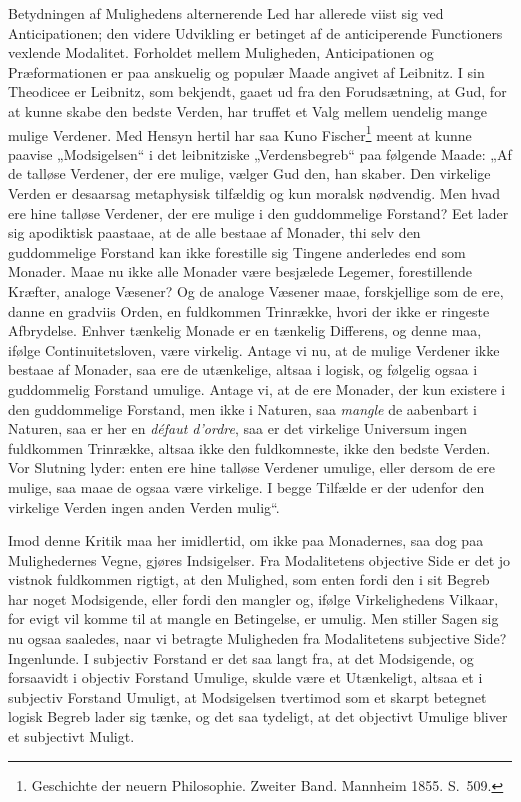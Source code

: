 \documentclass[12pt]{book}
\newcommand{\opage}[1]{\marginnote{\footnotesize\textit{[#1]}}}
\begin{document}
Betydningen af Mulighedens alternerende Led har allerede viist sig ved Anticipationen; den videre Udvikling er betinget af de anticiperende Functioners vexlende Modalitet. Forholdet mellem Muligheden, Anticipationen og Præformationen er paa anskuelig og populær Maade angivet af Leibnitz. I sin Theodicee er Leibnitz, som bekjendt, gaaet ud fra den Forudsætning, at Gud, for at kunne skabe den bedste Verden, har truffet et Valg mellem uendelig mange mulige Verdener. Med Hensyn hertil har saa Kuno Fischer\footnote{Geschichte der neuern Philosophie. Zweiter Band. Mannheim 1855. S.~509.}%
{} meent at kunne paavise „Modsigelsen“ i det leibnitziske „Verdensbegreb“ paa følgende Maade: „Af de talløse Verdener, der ere mulige, vælger Gud den, han skaber. Den virkelige Verden er desaarsag metaphysisk tilfældig og kun moralsk nødvendig. Men hvad ere hine talløse Verdener, der ere mulige i den guddommelige Forstand? Eet lader sig apodiktisk paastaae, at de alle bestaae af Monader, thi selv den guddommelige Forstand kan ikke forestille sig Tingene anderledes end som Monader. Maae nu ikke alle Monader være besjælede Legemer, forestillende Kræfter, analoge Væsener? Og de analoge Væsener maae, forskjellige
\opage{240}som de ere, danne en gradviis Orden, en fuldkommen Trinrække, hvori der ikke er ringeste Afbrydelse. Enhver tænkelig Monade er en tænkelig Differens, og denne maa, ifølge Continuitetsloven, være virkelig. Antage vi nu, at de mulige Verdener ikke bestaae af Monader, saa ere de utænkelige, altsaa i logisk, og følgelig ogsaa i guddommelig Forstand umulige. Antage vi, at de ere Monader, der kun existere i den guddommelige Forstand, men ikke i Naturen, saa \emph{mangle} de aabenbart i Naturen, saa er her en \textit{défaut d'ordre}, saa er det virkelige Universum ingen fuldkommen Trinrække, altsaa ikke den fuldkomneste, ikke den bedste Verden. Vor Slutning lyder: enten ere hine talløse Verdener umulige, eller dersom de ere mulige, saa maae de ogsaa være virkelige. I begge Tilfælde er der udenfor den virkelige Verden ingen anden Verden mulig“.

Imod denne Kritik maa her imidlertid, om ikke paa Monadernes, saa dog paa Mulighedernes Vegne, gjøres Indsigelser. Fra Modalitetens objective Side er det jo vistnok fuldkommen rigtigt, at den Mulighed, som enten fordi den i sit Begreb har noget Modsigende, eller fordi den mangler og, ifølge Virkelighedens Vilkaar, for evigt vil komme til at mangle en Betingelse, er umulig. Men stiller Sagen sig nu ogsaa saaledes, naar vi betragte Muligheden fra Modalitetens subjective Side? Ingenlunde. I subjectiv Forstand er det saa langt fra, at det Modsigende, og forsaavidt i objectiv Forstand Umulige, skulde være et Utænkeligt, altsaa et i subjectiv Forstand Umuligt, at Modsigelsen tvertimod som et skarpt betegnet logisk Begreb lader sig tænke, og det saa tydeligt, at det objectivt Umulige bliver et subjectivt Muligt.
\end{document}
